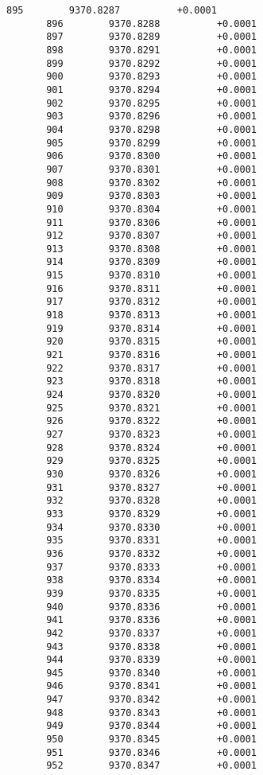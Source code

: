 \documentclass[11pt]{article}
\begin{document}
\begin{Verbatim}[commandchars=\\\{\}]
       895        9370.8287          +0.0001
       896        9370.8288          +0.0001
       897        9370.8289          +0.0001
       898        9370.8291          +0.0001
       899        9370.8292          +0.0001
       900        9370.8293          +0.0001
       901        9370.8294          +0.0001
       902        9370.8295          +0.0001
       903        9370.8296          +0.0001
       904        9370.8298          +0.0001
       905        9370.8299          +0.0001
       906        9370.8300          +0.0001
       907        9370.8301          +0.0001
       908        9370.8302          +0.0001
       909        9370.8303          +0.0001
       910        9370.8304          +0.0001
       911        9370.8306          +0.0001
       912        9370.8307          +0.0001
       913        9370.8308          +0.0001
       914        9370.8309          +0.0001
       915        9370.8310          +0.0001
       916        9370.8311          +0.0001
       917        9370.8312          +0.0001
       918        9370.8313          +0.0001
       919        9370.8314          +0.0001
       920        9370.8315          +0.0001
       921        9370.8316          +0.0001
       922        9370.8317          +0.0001
       923        9370.8318          +0.0001
       924        9370.8320          +0.0001
       925        9370.8321          +0.0001
       926        9370.8322          +0.0001
       927        9370.8323          +0.0001
       928        9370.8324          +0.0001
       929        9370.8325          +0.0001
       930        9370.8326          +0.0001
       931        9370.8327          +0.0001
       932        9370.8328          +0.0001
       933        9370.8329          +0.0001
       934        9370.8330          +0.0001
       935        9370.8331          +0.0001
       936        9370.8332          +0.0001
       937        9370.8333          +0.0001
       938        9370.8334          +0.0001
       939        9370.8335          +0.0001
       940        9370.8336          +0.0001
       941        9370.8336          +0.0001
       942        9370.8337          +0.0001
       943        9370.8338          +0.0001
       944        9370.8339          +0.0001
       945        9370.8340          +0.0001
       946        9370.8341          +0.0001
       947        9370.8342          +0.0001
       948        9370.8343          +0.0001
       949        9370.8344          +0.0001
       950        9370.8345          +0.0001
       951        9370.8346          +0.0001
       952        9370.8347          +0.0001

\end{Verbatim}
\end{document}
